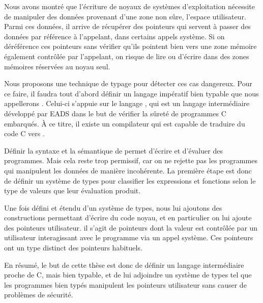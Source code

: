 
Nous avons montré que l'écriture de noyaux de systèmes d'exploitation nécessite
de manipuler des données provenant d'une zone non sûre, l'espace utilisateur.
Parmi ces données, il arrive de récupérer des pointeurs qui servent à passer des
données par référence à l'appelant, dans certains appels système. Si on
déréférence ces pointeurs sans vérifier qu'ils pointent bien vers une zone
mémoire également contrôlée par l'appelant, on risque de lire ou d'écrire dans
des zones mémoires réservées au noyau seul.

Nous proposons une technique de typage pour détecter ces cas dangereux. Pour ce
faire, il faudra tout d'abord définir un langage impératif bien typable que nous
appellerons \langname.
Celui-ci s'appuie sur le langage \newspeak, qui est un langage intermédiaire
développé par EADS dans le but de vérifier la sûreté de programmes C embarqués.
À ce titre, il existe un compilateur qui est capable de traduire du code C vers
\newspeak.

Définir la syntaxe et la sémantique de \langname permet d'écrire et d'évaluer
des programmes. Mais cela reste trop permissif, car on ne rejette pas les
programmes qui manipulent les données de manière incohérente. La première étape
est donc de définir un système de types pour classifier les expressions et
fonctions selon le type de valeurs que leur évaluation produit.

Une fois \langname défini et étendu d'un système de types, nous lui ajoutons des
constructions permettant d'écrire du code noyau, et en particulier on lui ajoute
des pointeurs utilisateur. il s'agit de pointeurs dont la valeur est contrôlée
par un utilisateur interagissant avec le programme via un appel système. Ces
pointeurs ont un type distinct des pointeurs habituels.

En résumé, le but de cette thèse est donc de définir un langage intermédiaire
proche de C, mais bien typable, et de lui adjoindre un système de types tel que
les programmes bien typés manipulent les pointeurs utilisateur sans causer de
problèmes de sécurité.



